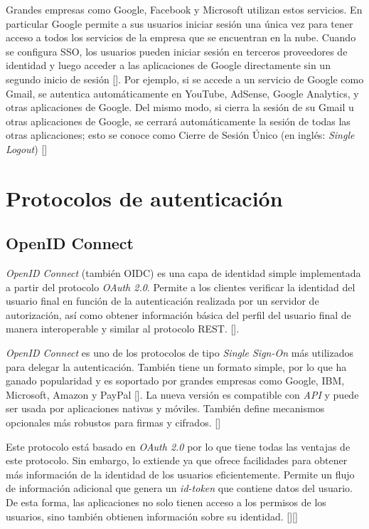 Grandes empresas como Google, Facebook y Microsoft utilizan estos servicios. En particular Google permite a sus usuarios iniciar sesión una única vez para tener acceso a todos los servicios de la empresa que se encuentran en la nube. Cuando se configura SSO, los usuarios pueden iniciar sesión en terceros proveedores de identidad y luego acceder a las aplicaciones de Google directamente sin un segundo inicio de sesión [\cite{google-support}]. Por ejemplo, si se accede a un servicio de Google como Gmail, se autentica automáticamente en YouTube, AdSense, Google Analytics, y otras aplicaciones de Google. Del mismo modo, si cierra la sesión de su Gmail u otras aplicaciones de Google, se cerrará automáticamente la sesión de todas las otras aplicaciones; esto se conoce como Cierre de Sesión Único (en inglés: \textit{Single Logout}) [\cite{sso-doc}]

\section*{Protocolos de autenticación}

\subsection*{OpenID Connect}
\textit{OpenID Connect}  (también OIDC) es una capa de identidad simple implementada a partir del protocolo \textit{OAuth 2.0}. Permite a los clientes verificar la identidad del usuario final en función de la autenticación realizada por un servidor de autorización, así como obtener información básica del perfil del usuario final de manera interoperable y similar al protocolo REST. [\cite{openid-doc}]. 

\textit{OpenID Connect }es uno de los protocolos de tipo \textit{Single Sign-On} más utilizados para delegar la autenticación. También tiene un formato simple, por lo que ha ganado popularidad y es soportado por grandes empresas como Google, IBM, Microsoft, Amazon y PayPal [\cite{mainka2017sok}]. La nueva versión es compatible con \textit{API} y puede ser usada por aplicaciones nativas y móviles. También define mecanismos opcionales más robustos para firmas y cifrados. [\cite{openid-doc}]

Este protocolo está basado en \textit{OAuth 2.0} por lo que tiene todas las ventajas de este protocolo. Sin embargo, lo extiende ya que ofrece facilidades para obtener más información de la identidad de los usuarios eficientemente. Permite un flujo de información adicional que genera un \textit{id-token} que contiene datos del usuario. De esta forma, las aplicaciones no solo tienen acceso a los permisos de los usuarios, sino también obtienen información sobre su identidad.  [\cite{openid-doc}][\cite{kutera2016single}]


